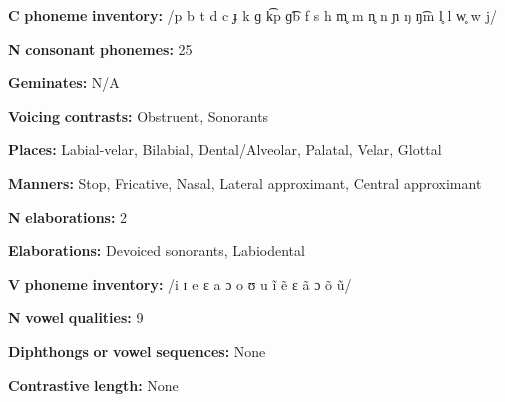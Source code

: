 \documentclass[output=paper]{langsci/langscibook}
\begin{document}
\begin{styleBody}
\textbf{C} \textbf{phoneme} \textbf{inventory:} /p b t d c ɟ k ɡ k͡p ɡ͡b f s h m̥ m n̥ n ɲ ŋ ŋ͡m l̥ l w̥ w j/
\end{styleBody}

\begin{styleBody}
\textbf{N} \textbf{consonant} \textbf{phonemes:} 25
\end{styleBody}

\begin{styleBody}
\textbf{Geminates:} N/A
\end{styleBody}

\begin{styleBody}
\textbf{Voicing} \textbf{contrasts:} Obstruent, Sonorants
\end{styleBody}

\begin{styleBody}
\textbf{Places:} Labial-velar, Bilabial, Dental/Alveolar, Palatal, Velar, Glottal
\end{styleBody}

\begin{styleBody}
\textbf{Manners:} Stop, Fricative, Nasal, Lateral approximant, Central approximant
\end{styleBody}

\begin{styleBody}
\textbf{N} \textbf{elaborations:} 2
\end{styleBody}

\begin{styleBody}
\textbf{Elaborations:} Devoiced sonorants, Labiodental
\end{styleBody}

\begin{styleBody}
\textbf{V} \textbf{phoneme} \textbf{inventory:} /i ɪ e ɛ a ɔ o ʊ u ĩ ẽ ɛ ã ɔ õ ũ/
\end{styleBody}

\begin{styleBody}
\textbf{N} \textbf{vowel} \textbf{qualities:} 9
\end{styleBody}

\begin{styleBody}
\textbf{Diphthongs} \textbf{or} \textbf{vowel} \textbf{sequences:} None
\end{styleBody}

\begin{styleBody}
\textbf{Contrastive} \textbf{length:} None
\end{styleBody}
\end{document}
